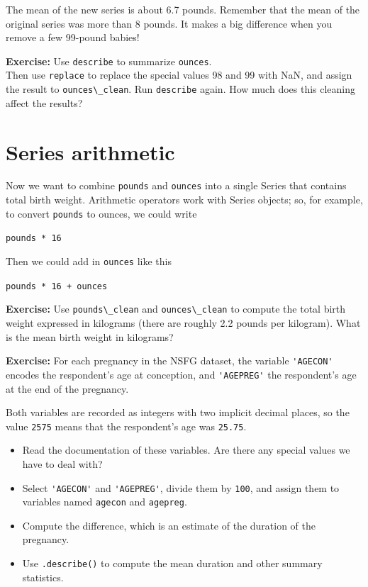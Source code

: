 The mean of the new series is about 6.7 pounds. Remember that the mean
of the original series was more than 8 pounds. It makes a big difference
when you remove a few 99-pound babies!

\textbf{Exercise:} Use \passthrough{\lstinline!describe!} to summarize
\passthrough{\lstinline!ounces!}.\\
Then use \passthrough{\lstinline!replace!} to replace the special values
98 and 99 with NaN, and assign the result to
\passthrough{\lstinline!ounces\_clean!}. Run
\passthrough{\lstinline!describe!} again. How much does this cleaning
affect the results?

\hypertarget{series-arithmetic}{%
\section{Series arithmetic}\label{series-arithmetic}}

Now we want to combine \passthrough{\lstinline!pounds!} and
\passthrough{\lstinline!ounces!} into a single Series that contains
total birth weight. Arithmetic operators work with Series objects; so,
for example, to convert \passthrough{\lstinline!pounds!} to ounces, we
could write

\passthrough{\lstinline!pounds * 16!}

Then we could add in \passthrough{\lstinline!ounces!} like this

\passthrough{\lstinline!pounds * 16 + ounces!}

\textbf{Exercise:} Use \passthrough{\lstinline!pounds\_clean!} and
\passthrough{\lstinline!ounces\_clean!} to compute the total birth
weight expressed in kilograms (there are roughly 2.2 pounds per
kilogram). What is the mean birth weight in kilograms?

\textbf{Exercise:} For each pregnancy in the NSFG dataset, the variable
\passthrough{\lstinline!'AGECON'!} encodes the respondent's age at
conception, and \passthrough{\lstinline!'AGEPREG'!} the respondent's age
at the end of the pregnancy.

Both variables are recorded as integers with two implicit decimal
places, so the value \passthrough{\lstinline!2575!} means that the
respondent's age was \passthrough{\lstinline!25.75!}.

\begin{itemize}
\item
  Read the documentation of these variables. Are there any special
  values we have to deal with?
\item
  Select \passthrough{\lstinline!'AGECON'!} and
  \passthrough{\lstinline!'AGEPREG'!}, divide them by
  \passthrough{\lstinline!100!}, and assign them to variables named
  \passthrough{\lstinline!agecon!} and
  \passthrough{\lstinline!agepreg!}.
\item
  Compute the difference, which is an estimate of the duration of the
  pregnancy.
\item
  Use \passthrough{\lstinline!.describe()!} to compute the mean duration
  and other summary statistics.
\end{itemize}


